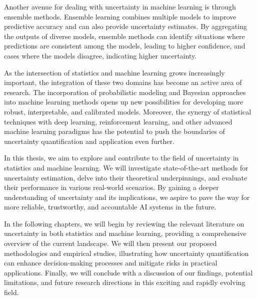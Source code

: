 Another avenue for dealing with uncertainty in machine learning is through ensemble methods. Ensemble learning combines multiple models to improve predictive accuracy and can also provide uncertainty estimates. By aggregating the outputs of diverse models, ensemble methods can identify situations where predictions are consistent among the models, leading to higher confidence, and cases where the models disagree, indicating higher uncertainty.

As the intersection of statistics and machine learning grows increasingly important, the integration of these two domains has become an active area of research. The incorporation of probabilistic modeling and Bayesian approaches into machine learning methods opens up new possibilities for developing more robust, interpretable, and calibrated models. Moreover, the synergy of statistical techniques with deep learning, reinforcement learning, and other advanced machine learning paradigms has the potential to push the boundaries of uncertainty quantification and application even further.

In this thesis, we aim to explore and contribute to the field of uncertainty in statistics and machine learning. We will investigate state-of-the-art methods for uncertainty estimation, delve into their theoretical underpinnings, and evaluate their performance in various real-world scenarios. By gaining a deeper understanding of uncertainty and its implications, we aspire to pave the way for more reliable, trustworthy, and accountable AI systems in the future.

In the following chapters, we will begin by reviewing the relevant literature on uncertainty in both statistics and machine learning, providing a comprehensive overview of the current landscape. We will then present our proposed methodologies and empirical studies, illustrating how uncertainty quantification can enhance decision-making processes and mitigate risks in practical applications. Finally, we will conclude with a discussion of our findings, potential limitations, and future research directions in this exciting and rapidly evolving field.

\fi
\fi